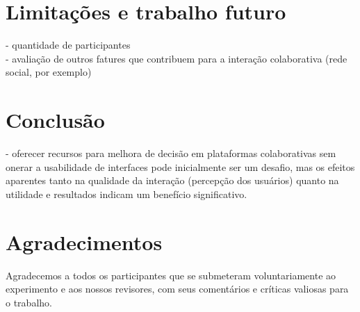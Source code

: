 \documentclass{sigchi}
\begin{document}
\section{Limitações e trabalho futuro}
- quantidade de participantes\\
- avaliação de outros fatures que contribuem para a interação colaborativa (rede social, por exemplo)

\section{Conclusão}
- oferecer recursos para melhora de decisão em plataformas colaborativas sem onerar a usabilidade de interfaces pode inicialmente ser um desafio, mas os efeitos aparentes tanto na qualidade da interação (percepção dos usuários) quanto na utilidade e resultados indicam um benefício significativo.


\section{Agradecimentos}

Agradecemos a todos os participantes que se submeteram voluntariamente ao experimento e aos nossos revisores, com seus comentários e críticas valiosas para o trabalho.


\balance{}


\balance{}



\end{document}
